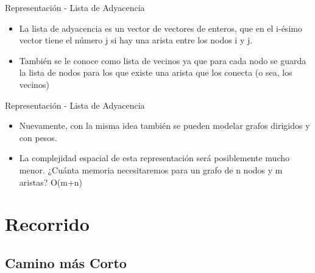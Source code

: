 \documentclass[handout]{beamer} %
\begin{document}
\begin{frame}{Representación - Lista de Adyacencia}
  \begin{itemize}
    \item La lista de adyacencia es un vector de vectores de enteros, que en el
i-ésimo vector tiene el número j si hay una arista entre los nodos i y j.
\item También se le conoce como lista de vecinos ya que para cada nodo
se guarda la lista de nodos para los que existe una arista que los
conecta (o sea, los vecinos)

\end{itemize}
\end{frame}

\begin{frame}{Representación - Lista de Adyacencia}
  \begin{itemize}
    \item Nuevamente, con la misma idea también se pueden modelar grafos
dirigidos y con pesos.
\item La complejidad espacial de esta representación será posiblemente
mucho menor. ¿Cuánta memoria necesitaremos para un grafo de n
nodos y m aristas? O(m+n)

\end{itemize}

\end{frame}

\section{Recorrido}
\subsection{Camino más Corto}
\end{document}

